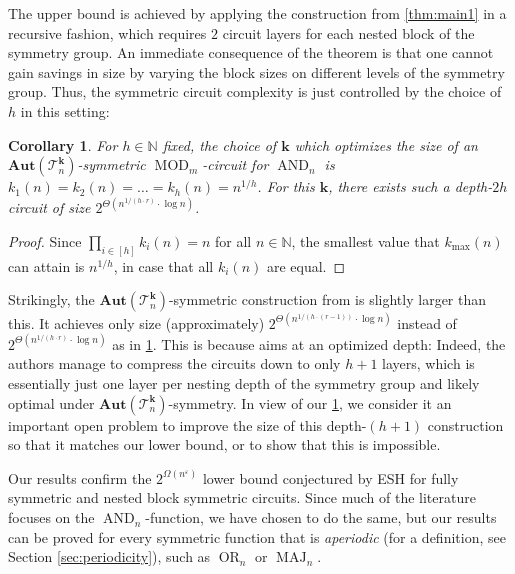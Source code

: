 \documentclass[11pt]{article}
\DeclareMathOperator{\MOD}{MOD}
\DeclareMathOperator{\AND}{AND}
\newcommand{\Aut}{\mathbf{Aut}}
\newcommand{\bbN}{\mathbb{N}}
\newcommand{\Tt}{{\mathcal T}}
\theoremstyle{definition}
\theoremstyle{plain}
\newtheorem{corollary}[definition]{Corollary}
\theoremstyle{remark}
\theoremstyle{remark}
\renewcommand{\epsilon}{\varepsilon}
\DeclareMathOperator{\MAJ}{MAJ}
\DeclareMathOperator{\OR}{OR}
\begin{document}
The upper bound is achieved by applying the construction from \cref{thm:main1} in a recursive fashion, which requires $2$ circuit layers for each nested block of the symmetry group. An immediate consequence of the theorem is that one cannot gain savings in size by varying the block sizes on different levels of the symmetry group. Thus, the symmetric circuit complexity is just controlled by the choice of $h$ in this setting:

\begin{corollary}
	\label{cor:optimalNestedSize}
	For $h \in \bbN$ fixed, the choice of $\boldsymbol{k}$ which optimizes the size of an $\Aut(\Tt_n^{\boldsymbol k})$-symmetric $\MOD_m$-circuit for $\AND_n$ is $k_1(n) = k_2(n) = \dots = k_h(n) = n^{1/h}$. For this $\boldsymbol{k}$, there exists such a depth-$2h$ circuit of size $2^{\Theta(n^{1/(h \cdot r)} \cdot \log n)}$.
\end{corollary}	
\begin{proof}
	Since $\prod_{i \in [h]} k_i(n) = n$ for all $n \in \bbN$, the smallest value that $k_{\text{max}}(n)$ can attain is $n^{1/h}$, in case that all $k_i(n)$ are equal.
\end{proof}	
Strikingly, the $\Aut(\Tt_n^{\boldsymbol{k}})$-symmetric construction from \cite[Proposition 4.3]{IdziakKK22LICS} is slightly larger than this. It achieves only size (approximately) $2^{\Theta(n^{1/(h \cdot (r-1))} \cdot \log n)}$ instead of $2^{\Theta(n^{1/(h \cdot r)} \cdot \log n)}$ as in \cref{cor:optimalNestedSize}. 
This is because \cite[Proposition 4.3]{IdziakKK22LICS} aims at an optimized depth: Indeed, the authors manage to compress the circuits down to only $h+1$ layers, which is essentially just one layer per nesting depth of the symmetry group and likely optimal under $\Aut(\Tt_n^{\boldsymbol{k}})$-symmetry. In view of our \cref{cor:optimalNestedSize}, we consider it an important open problem to improve the size of this depth-$(h+1)$ construction so that it matches our lower bound, or to show that this is impossible. 

Our results confirm the $2^{\Omega(n^\epsilon)}$ lower bound conjectured by ESH for fully symmetric and nested block symmetric circuits. Since much of the literature focuses on the $\AND_n$-function, we have chosen to do the same, but our results can be proved for every symmetric function that is \emph{aperiodic} (for a definition, see Section \ref{sec:periodicity}), such as $\OR_n$ or $\MAJ_n$.\\ 
\end{document}
